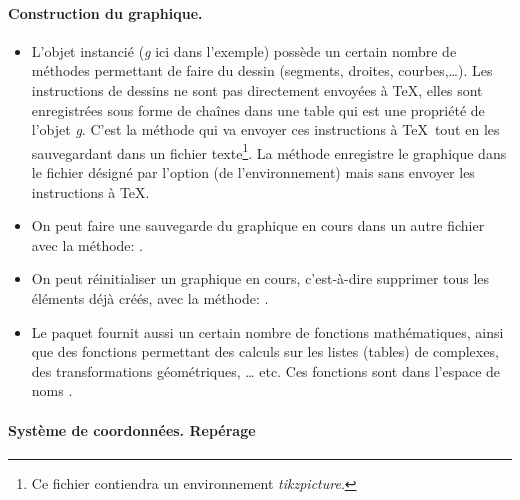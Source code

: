 \paragraph{Construction du graphique.}

\begin{itemize}
    \item L'objet instancié (\emph{g} ici dans l'exemple) possède un certain nombre de méthodes permettant de faire du dessin (segments, droites, courbes,\dots). Les instructions de dessins ne sont pas directement envoyées à \TeX, elles sont enregistrées sous forme de chaînes dans une table qui est une propriété de l'objet \emph{g}. C'est la méthode  qui va envoyer ces instructions à \TeX\ tout en les sauvegardant dans un fichier texte\footnote{Ce fichier contiendra un environnement \emph{tikzpicture}.}. La méthode  enregistre le graphique dans le fichier désigné par l'option (de l'environnement)  mais sans envoyer les instructions à \TeX.
    
    \item On peut faire une sauvegarde du graphique en cours dans un autre fichier avec la méthode: .
    
    \item On peut réinitialiser un graphique en cours, c'est-à-dire supprimer tous les éléments déjà créés, avec la méthode: .
    
    \item Le paquet \luadrawenv fournit aussi un certain nombre de fonctions mathématiques, ainsi que des fonctions permettant des calculs sur les listes (tables) de complexes, des transformations géométriques, \ldots{} etc. Ces fonctions sont dans l'espace de noms \luadrawenv.
\end{itemize}


\paragraph{Système de coordonnées. Repérage}

